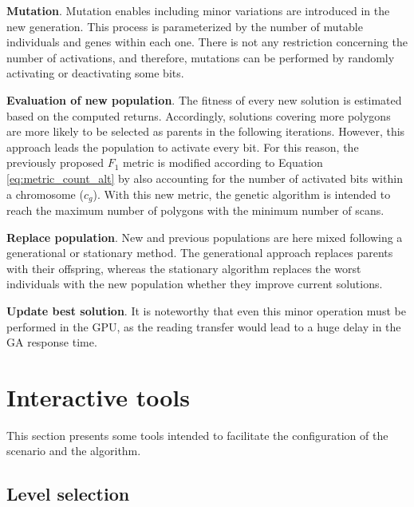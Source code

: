 \textbf{Mutation}. Mutation enables including minor variations are introduced in the new generation. This process is parameterized by the number of mutable individuals and genes within each one. There is not any restriction concerning the number of activations, and therefore, mutations can be performed by randomly activating or deactivating some bits.

\textbf{Evaluation of new population}. The fitness of every new solution is estimated based on the computed returns. Accordingly, solutions covering more polygons are more likely to be selected as parents in the following iterations. However, this approach leads the population to activate every bit. For this reason, the previously proposed $F_1$ metric is modified according to Equation \ref{eq:metric_count_alt} by also accounting for the number of activated bits within a chromosome ($c_g$). With this new metric, the genetic algorithm is intended to reach the maximum number of polygons with the minimum number of scans.

\textbf{Replace population}. New and previous populations are here mixed following a generational or stationary method. The generational approach replaces parents with their offspring, whereas the stationary algorithm replaces the worst individuals with the new population whether they improve current solutions.

\textbf{Update best solution}. It is noteworthy that even this minor operation must be performed in the GPU, as the reading transfer would lead to a huge delay in the GA response time.

\section{Interactive tools}

This section presents some tools intended to facilitate the configuration of the scenario and the algorithm.

\subsection{Level selection}

